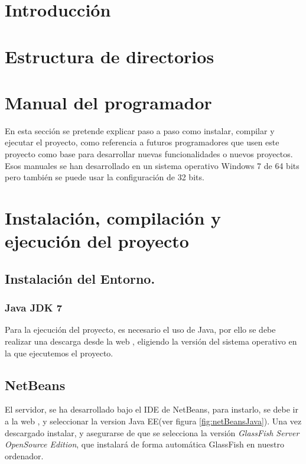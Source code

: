 
\section{Introducción}

\section{Estructura de directorios}

\section{Manual del programador}
En esta sección se pretende explicar paso a paso como instalar, compilar y ejecutar el proyecto, como referencia a futuros programadores que usen este proyecto como base para desarrollar nuevas funcionalidades o nuevos proyectos.
Esos manuales se han desarrollado en un sistema operativo Windows 7 de 64 bits pero también se puede usar la configuración de 32 bits.
\section{Instalación, compilación y ejecución del proyecto}

\subsection{Instalación del Entorno.}

	\subsubsection{Java JDK 7}
	Para la ejecución del proyecto, es necesario el uso de Java, por ello se debe realizar una descarga desde la web \cite{java}, eligiendo la versión del sistema operativo en la que ejecutemos el proyecto.
	\subsection{NetBeans}
	El servidor, se ha desarrollado bajo el IDE de NetBeans, para instarlo, se debe ir a la web \cite{netbeans}, y seleccionar la version Java EE(ver figura \ref{fig:netBeansJava}).
	Una vez descargado instalar, y asegurarse de que se selecciona la versión \textit{GlassFish Server OpenSource Edition}, que instalará de forma automática GlassFish en nuestro ordenador.
	
